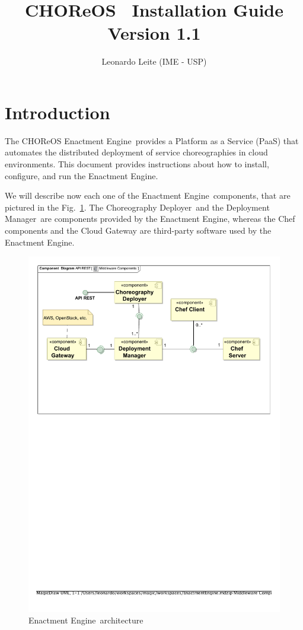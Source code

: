 \documentclass[a4paper, 10pt]{article}
\title{CHOReOS \ee\ Installation Guide \\ {\normalsize Version 1.1}}
\author{Leonardo Leite (IME - USP)}
\newcommand{\ee}{Enactment Engine}
\newcommand{\cd}{Choreography Deployer}
\newcommand{\dm}{Deployment Manager}
\begin{document}
\maketitle

\section{Introduction}

The CHOReOS \ee\ provides a Platform as a Service (PaaS) that automates the distributed deployment of service choreographies in cloud environments. This document provides instructions about how to install, configure, and run the \ee.

We will describe now each one of the \ee\ components, that are pictured in the Fig.~\ref{fig:ee_components}. The \cd\ and the \dm\ are components provided by the \ee, whereas the Chef components and the Cloud Gateway are third-party software used by the \ee.

\begin{figure}
\centering
\includegraphics[scale=0.7]{img/components.pdf}
\caption{\ee\ architecture}
\label{fig:ee_components}
\end{figure}
\end{document}
